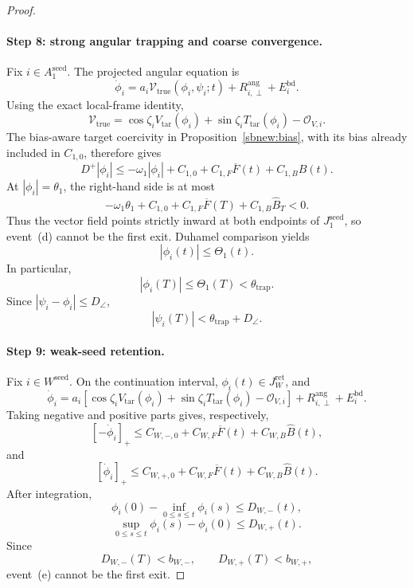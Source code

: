 \documentclass{article} %
\theoremstyle{plain}
\theoremstyle{definition}
\theoremstyle{remark}
\begin{document}
\begin{proof}
\paragraph{Step 8: strong angular trapping and coarse convergence.}

Fix $i\in A_1^{\mathrm{seed}}$.  The projected angular equation is
\[
\dot\phi_i
=
a_i\mathcal V_{\mathrm{true}}(\phi_i,\psi_i;t)
+
R_{i,\perp}^{\mathrm{ang}}
+
E_i^{\mathrm{bd}}.
\]
Using the exact local-frame identity,
\[
\mathcal V_{\mathrm{true}}
=
\cos\zeta_iV_{\mathrm{tar}}(\phi_i)
+
\sin\zeta_iT_{\mathrm{tar}}(\phi_i)
-
\mathcal O_{V,i}.
\]
The bias-aware target coercivity in Proposition~\ref{sbnew:bias},
with its bias already included in $C_{1,0}$, therefore gives
\[
D^+|\phi_i|
\le
-\omega_1|\phi_i|
+
C_{1,0}
+
C_{1,F}\overline F(t)
+
C_{1,B}\widehat B(t).
\]
At $|\phi_i|=\theta_1$, the right-hand side is at most
\[
-\omega_1\theta_1
+
C_{1,0}
+
C_{1,F}\overline F(T)
+
C_{1,B}\widehat B_T
<0.
\]
Thus the vector field points strictly inward at both endpoints of
$J_1^{\mathrm{seed}}$, so event~\textnormal{(d)} cannot be the first exit.
Duhamel comparison yields
\[
|\phi_i(t)|
\le
\Theta_1(t).
\]
In particular,
\[
|\phi_i(T)|
\le
\Theta_1(T)
<
\theta_{\mathrm{trap}}.
\]
Since $|\psi_i-\phi_i|\le D_\angle$,
\[
|\psi_i(T)|
<
\theta_{\mathrm{trap}}+D_\angle.
\]

\paragraph{Step 9: weak-seed retention.}

Fix $i\in W^{\mathrm{seed}}$.  On the continuation interval,
$\phi_i(t)\in J_W^{\mathrm{ret}}$, and
\[
\dot\phi_i
=
a_i
\left[
\cos\zeta_iV_{\mathrm{tar}}(\phi_i)
+
\sin\zeta_iT_{\mathrm{tar}}(\phi_i)
-
\mathcal O_{V,i}
\right]
+
R_{i,\perp}^{\mathrm{ang}}
+
E_i^{\mathrm{bd}}.
\]
Taking negative and positive parts gives, respectively,
\[
[-\dot\phi_i]_+
\le
C_{W,-,0}
+
C_{W,F}\overline F(t)
+
C_{W,B}\widehat B(t),
\]
and
\[
[\dot\phi_i]_+
\le
C_{W,+,0}
+
C_{W,F}\overline F(t)
+
C_{W,B}\widehat B(t).
\]
After integration,
\[
\phi_i(0)-\inf_{0\le s\le t}\phi_i(s)
\le
D_{W,-}(t),
\]
\[
\sup_{0\le s\le t}\phi_i(s)-\phi_i(0)
\le
D_{W,+}(t).
\]
Since
\[
D_{W,-}(T)<b_{W,-},
\qquad
D_{W,+}(T)<b_{W,+},
\]
event~\textnormal{(e)} cannot be the first exit.


\end{proof}
\end{document}
